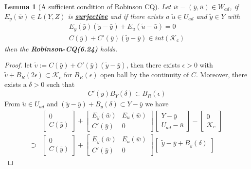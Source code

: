 \documentclass[a4paper,11pt,fleqn]{book}
\newtheorem{lemma}[theorem]{Lemma}
\theoremstyle{definition}
\theoremstyle{remark}
\begin{document}
\begin{lemma}[A sufficient condition of Robinson CQ]
	Let $\bar{w} = (\bar{y}, \bar{u}) \in W_{ad}$, if $E_y(\bar{w}) \in L(Y, Z)$ is \underline{\textbf{surjective}} and if there exists a $\tilde{u} \in U_{ad}$ and $\tilde{y} \in Y$ with
	\begin{align*}
		E_y(\bar{y})(\tilde{y} - \bar{y}) + E_u(\tilde{u} - \bar{u}) = 0\\
		C(\bar{y}) + C'(\bar{y})(\tilde{y} - \bar{y}) \in int(\mathcal{K}_c)
	\end{align*}
	then the \textbf{Robinson-CQ(6.24)} holds.
\end{lemma}
\begin{proof}
	 let $\tilde{v}:= C(\bar{y}) + C'(\bar{y})(\tilde{y} - \bar{y})$, then there exists $\epsilon > 0$ with $\tilde{v} + B_R(2 \epsilon) \subset \mathcal{K}_c$ for $B_R(\epsilon)$ open ball by the continuity of $C$. Moreover, there exists a $\delta > 0$ such that
	 \begin{align*}
	 	C'(\bar{y}) B_Y(\delta) \subset B_R(\epsilon)
	 \end{align*}
	 From $\tilde{u} \in U_{ad}$ and $(\tilde{y} - \bar{y}) + B_y(\delta) \subset Y - \bar{y}$ we have
	 \begin{align*}
	 	&\begin{bmatrix}
	 		0\\
	 		C(\bar{y})
	 	\end{bmatrix}
	 	+ 
	 	\begin{bmatrix}
	 		E_y(\bar{w}) & E_u(\bar{w})\\
	 		C'(\bar{y}) & 0
	 	\end{bmatrix}
	 	\begin{bmatrix}
	 		Y - \bar{y} \\
	 		U_{ad} - \bar{u} 
	 	\end{bmatrix}
	 	-
	 	\begin{bmatrix}
	 		0\\
	 		\mathcal{K}_c
	 	\end{bmatrix}\\
	 	\supset &
	 	\begin{bmatrix}
	 		0\\
	 		C(\bar{y})
	 	\end{bmatrix}
	 	+ 
	 	\begin{bmatrix}
	 		E_y(\bar{w}) & E_u(\bar{w})\\
	 		C'(\bar{y}) & 0
	 	\end{bmatrix}
	 	\begin{bmatrix}
	 		\tilde{y} - \bar{y} + B_y(\delta)\\

\end{bmatrix}
\end{align*}
\end{proof}
\end{document}
